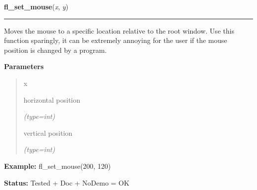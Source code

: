 \hspace{.8\funcindent}\begin{boxedminipage}{\funcwidth}

    \raggedright \textbf{fl\_set\_mouse}(\textit{x}, \textit{y})

    \vspace{-1.5ex}

    \rule{\textwidth}{0.5\fboxrule}
\setlength{\parskip}{2ex}
    Moves the mouse to a specific location relative to the root window. Use
    this function sparingly, it can be extremely annoying for the user if 
    the mouse position is changed by a program.

\setlength{\parskip}{1ex}
      \textbf{Parameters}
      \vspace{-1ex}

      \begin{quote}
        \begin{Ventry}{x}

          \item[x]

          horizontal position

            {\it (type=int)}

          \item[y]

          vertical position

            {\it (type=int)}

        \end{Ventry}

      \end{quote}

\textbf{Example:} fl\_set\_mouse(200, 120)



\textbf{Status:} Tested + Doc + NoDemo = OK



    \end{boxedminipage}

    \label{xformslib:flxbasic:fl_get_win_mouse}

    \vspace{0.5ex}

